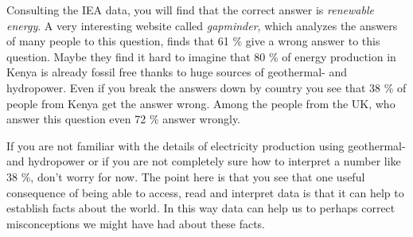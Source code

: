 \documentclass[
  letterpaper,
]{scrbook}
\begin{document}
Consulting the IEA data, you will find that the correct answer is
\emph{renewable energy}. A very interesting website called
\emph{gapminder}, which analyzes the answers of many people to this
question, finds that 61 \% give a wrong answer to this question. Maybe
they find it hard to imagine that 80 \% of energy production in Kenya is
already fossil free thanks to huge sources of geothermal- and
hydropower. Even if you
break the answers down by country you see that 38 \% of people from
Kenya get the answer wrong. Among the people from the UK, who answer
this question even 72 \% answer wrongly.

If you are not familiar with the details of electricity production using
geothermal- and hydropower or if you are not completely sure how to
interpret a number like 38 \%, don't worry for now. The point here is
that you see that one useful consequence of being able to access, read
and interpret data is that it can help to establish facts about the
world. In this way data can help us to perhaps correct misconceptions we
might have had about these facts.
\end{document}
